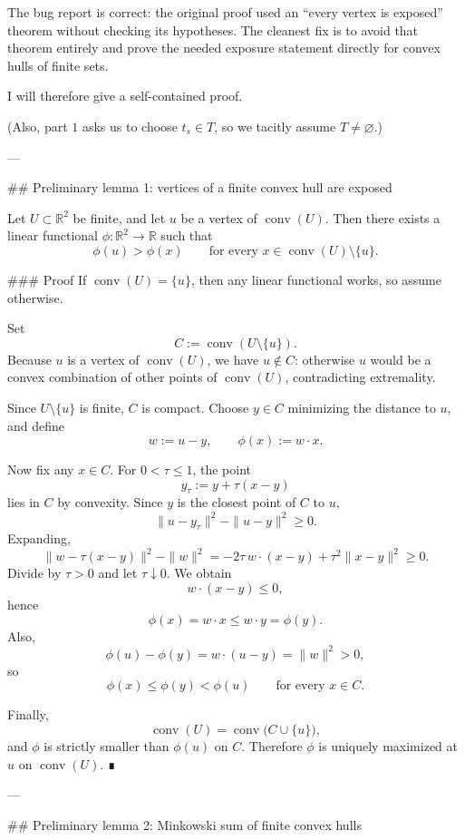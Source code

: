 The bug report is correct: the original proof used an “every vertex is exposed” theorem without checking its hypotheses. The cleanest fix is to avoid that theorem entirely and prove the needed exposure statement directly for convex hulls of finite sets.

I will therefore give a self-contained proof.

(Also, part \(1\) asks us to choose \(t_s\in T\), so we tacitly assume \(T\neq\varnothing\).)

---

## Preliminary lemma 1: vertices of a finite convex hull are exposed

Let \(U\subset\mathbb R^2\) be finite, and let \(u\) be a vertex of
\(\operatorname{conv}(U)\). Then there exists a linear functional
\(\phi:\mathbb R^2\to\mathbb R\) such that
\[
\phi(u)>\phi(x)\qquad\text{for every }x\in \operatorname{conv}(U)\setminus\{u\}.
\]

### Proof
If \(\operatorname{conv}(U)=\{u\}\), then any linear functional works, so assume otherwise.

Set
\[
C:=\operatorname{conv}(U\setminus\{u\}).
\]
Because \(u\) is a vertex of \(\operatorname{conv}(U)\), we have \(u\notin C\): otherwise \(u\) would be a convex combination of other points of \(\operatorname{conv}(U)\), contradicting extremality.

Since \(U\setminus\{u\}\) is finite, \(C\) is compact. Choose \(y\in C\) minimizing the distance to \(u\), and define
\[
w:=u-y,\qquad \phi(x):=w\cdot x.
\]

Now fix any \(x\in C\). For \(0<\tau\le 1\), the point
\[
y_\tau:=y+\tau(x-y)
\]
lies in \(C\) by convexity. Since \(y\) is the closest point of \(C\) to \(u\),
\[
\|u-y_\tau\|^2-\|u-y\|^2\ge 0.
\]
Expanding,
\[
\|w-\tau(x-y)\|^2-\|w\|^2
=
-2\tau\, w\cdot(x-y)+\tau^2\|x-y\|^2
\ge 0.
\]
Divide by \(\tau>0\) and let \(\tau\downarrow 0\). We obtain
\[
w\cdot(x-y)\le 0,
\]
hence
\[
\phi(x)=w\cdot x\le w\cdot y=\phi(y).
\]
Also,
\[
\phi(u)-\phi(y)=w\cdot(u-y)=\|w\|^2>0,
\]
so
\[
\phi(x)\le \phi(y)<\phi(u)\qquad\text{for every }x\in C.
\]

Finally,
\[
\operatorname{conv}(U)=\operatorname{conv}\bigl(C\cup\{u\}\bigr),
\]
and \(\phi\) is strictly smaller than \(\phi(u)\) on \(C\). Therefore \(\phi\) is uniquely maximized at \(u\) on \(\operatorname{conv}(U)\). ∎

---

## Preliminary lemma 2: Minkowski sum of finite convex hulls

